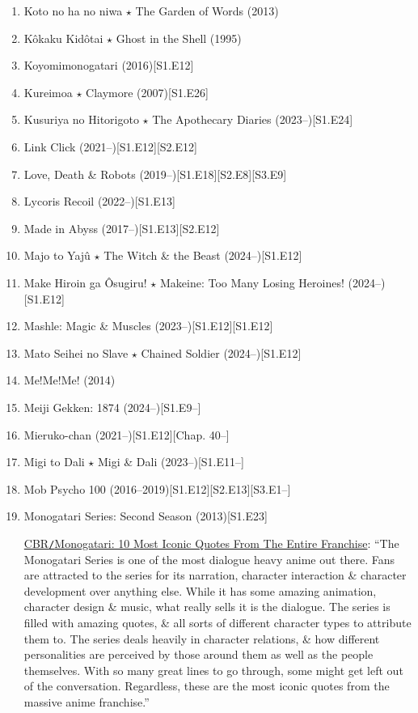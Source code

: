 \documentclass{article}
\begin{document}
\begin{enumerate}
    \item {\sc Koto no ha no niwa $\star$ The Garden of Words} (2013)
    \item {\sc K\^okaku Kid\^otai $\star$ Ghost in the Shell} (1995)
    \item {\sc Koyomimonogatari} (2016)\hfill[S1.E12]
    \item {\sc Kureimoa $\star$ Claymore} (2007)\hfill[S1.E26]
    \item {\sc Kusuriya no Hitorigoto $\star$ The Apothecary Diaries} (2023--)\hfill[S1.E24]
    \item Link Click (2021--)\hfill[S1.E12][S2.E12]
    \item Love, Death \& Robots (2019--)\hfill[S1.E18][S2.E8][S3.E9]
    \item Lycoris Recoil (2022--)\hfill[S1.E13]
    \item Made in Abyss (2017--)\hfill[S1.E13][S2.E12]
    \item {\sc Majo to Yajû $\star$ The Witch \& the Beast} (2024--)\hfill[S1.E12]
    \item {\sc Make Hiroin ga Ôsugiru! $\star$ Makeine: Too Many Losing Heroines!} (2024--)\hfill[S1.E12]
    \item {\sc Mashle: Magic \& Muscles} (2023--)\hfill[S1.E12][S1.E12]
    \item {\sc Mato Seihei no Slave $\star$ Chained Soldier} (2024--)\hfill[S1.E12]
    \item {\sc Me!Me!Me!} (2014)
    \item Meiji Gekken: 1874 (2024--)\hfill[S1.E9--]
    \item Mieruko-chan (2021--)\hfill[S1.E12][Chap. 40--]
    \item Migi to Dali $\star$ Migi \& Dali (2023--)\hfill[S1.E11--]
    \item Mob Psycho 100 (2016--2019)\hfill[S1.E12][S2.E13][S3.E1--]
    \item {\sc Monogatari Series: Second Season} (2013)\hfill[S1.E23]
    
    \href{https://www.cbr.com/monogatari-series-best-quotes/}{CBR{\tt/}Monogatari: 10 Most Iconic Quotes From The Entire Franchise}: ``The Monogatari Series is one of the most dialogue heavy anime out there. Fans are attracted to the series for its narration, character interaction \& character development over anything else. While it has some amazing animation, character design \& music, what really sells it is the dialogue. The series is filled with amazing quotes, \& all sorts of different character types to attribute them to. The series deals heavily in character relations, \& how different personalities are perceived by those around them as well as the people themselves. With so many great lines to go through, some might get left out of the conversation. Regardless, these are the most iconic quotes from the massive anime franchise.''
    

\end{enumerate}
\end{document}

